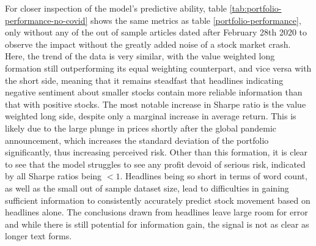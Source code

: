 For closer inspection of the model's predictive ability, table \ref{tab:portfolio-performance-no-covid} shows the same metrics as table \ref{portfolio-performance}, only without any of the out of sample articles dated after February 28th 2020 to observe the impact without the greatly added noise of a stock market crash. Here, the trend of the data is very similar, with the value weighted long formation still outperforming its equal weighting counterpart, and vice versa with the short side, meaning that it remains steadfast that headlines indicating negative sentiment about smaller stocks contain more reliable information than that with positive stocks. The most notable increase in Sharpe ratio is the value weighted long side, despite only a marginal increase in average return. This is likely due to the large plunge in prices shortly after the global pandemic announcement, which increases the standard deviation of the portfolio significantly, thus increasing perceived risk. Other than this formation, it is clear to see that the model struggles to see any profit devoid of serious risk, indicated by all Sharpe ratios being $<1$. Headlines being so short in terms of word count, as well as the small out of sample dataset size, lead to difficulties in gaining sufficient information to consistently accurately predict stock movement based on headlines alone. The conclusions drawn from headlines leave large room for error and while there is still potential for information gain, the signal is not as clear as longer text forms.

